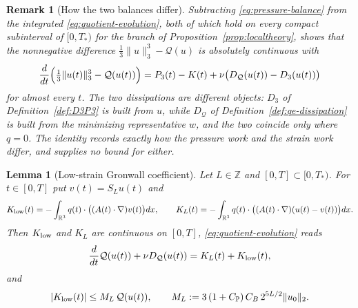 \documentclass[11pt]{article}
\newtheorem{remark}[theorem]{Remark}
\newtheorem{lemma}[theorem]{Lemma}
\theoremstyle{definition}
\theoremstyle{plain}
\newcommand{\R}{\mathbb R}
\newcommand{\norm}[1]{\lVert #1\rVert}
\begin{document}
\begin{remark}[How the two balances differ]\label{rem:distance-balance}
Subtracting \eqref{eq:pressure-balance} from the integrated
\eqref{eq:quotient-evolution}, both of which hold on every compact
subinterval of $[0,T_*)$ for the branch of
Proposition~\ref{prop:localtheory}, shows that the nonnegative difference
$\frac13\norm{u}_3^3-\mathcal Q(u)$ is absolutely continuous with
\[
 \frac d{dt}\Bigl(\tfrac13\norm{u(t)}_3^3-\mathcal Q(u(t))\Bigr)
 =P_3(t)-K(t)+\nu\bigl(D_{\mathcal Q}(u(t))-D_3(u(t))\bigr)
\]
for almost every $t$.  The two dissipations are different objects:
$D_3$ of Definition~\ref{def:D3P3} is built from $u$, while
$D_{\mathcal Q}$ of Definition~\ref{def:qe-dissipation} is built from the
minimizing representative $w$, and the two coincide only where $q=0$.  The
identity records exactly how the pressure work and the strain work differ,
and supplies no bound for either.
\end{remark}

\begin{lemma}[Low-strain Gronwall coefficient]\label{lem:quotient-lowstrain}
Let $L\in\mathbb Z$ and $[0,T]\subset[0,T_*)$.  For $t\in[0,T]$ put
$v(t)=S_Lu(t)$ and
\[
 K_{\rm low}(t)=-\int_{\R^3}q(t)\cdot\bigl((A(t)\cdot\nabla)v(t)\bigr)dx,
 \qquad
 K_L(t)=-\int_{\R^3}q(t)\cdot\bigl((A(t)\cdot\nabla)(u(t)-v(t))\bigr)dx .
\]
Then $K_{\rm low}$ and $K_L$ are continuous on $[0,T]$,
\eqref{eq:quotient-evolution} reads
\begin{equation}\label{eq:qe-split}
 \frac d{dt}\mathcal Q(u(t))+\nu D_{\mathcal Q}(u(t))=K_L(t)+K_{\rm low}(t),
\end{equation}
and
\begin{equation}\label{eq:qe-lowstrain}
 |K_{\rm low}(t)|\le M_L\,\mathcal Q(u(t)),
 \qquad
 M_L:=3\,(1+C_{\mathbb P})\,C_B\,2^{5L/2}\norm{u_0}_2 .
\end{equation}
\end{lemma}
\end{document}
